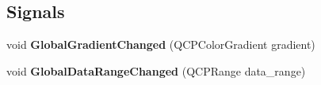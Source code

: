 \subsection*{Signals}
\begin{DoxyCompactItemize}
\item 
\hypertarget{class_main_window_ab2c4828c97d36f9dca59d7f0d5314b84}{void {\bfseries Global\+Gradient\+Changed} (Q\+C\+P\+Color\+Gradient gradient)}\label{class_main_window_ab2c4828c97d36f9dca59d7f0d5314b84}

\item 
\hypertarget{class_main_window_a6de945a7ef4b0a52998e1662bfb99c0f}{void {\bfseries Global\+Data\+Range\+Changed} (Q\+C\+P\+Range data\+\_\+range)}\label{class_main_window_a6de945a7ef4b0a52998e1662bfb99c0f}

\end{DoxyCompactItemize}

